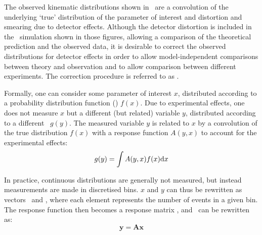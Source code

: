 The observed kinematic distributions shown in~ are a
convolution of the underlying `true' distribution of the parameter of interest
and distortion and smearing due to detector effects. Although 
the detector distortion is included in the \mc\ simulation shown in those
figures, allowing a comparison of the theoretical prediction and the observed
data, it is desirable to correct the observed distributions for detector effects
in order to allow model-independent comparisons between theory and observation
and to allow comparison between different experiments. The correction procedure
is referred to as . 

Formally, one can consider some parameter of interest $x$,
distributed according to a probability distribution function (\probDF) $f(x)$. Due to experimental effects, one
does not measure $x$ but a different (but related) variable $y$, distributed
according to a different \probDF\ $g(y)$. The measured variable $y$ is related to $x$ by a
convolution of the true distribution $f(x)$ with a response function $A(y,x)$ to account for the
experimental effects:
\begin{equation}
g(y) = \int A(y,x)f(x){\rm d}x 
\label{eqn:unfold-conv}
\end{equation}

In practice, continuous distributions are generally not measured, but instead
measurements are made
in discretised bins. $x$ and $y$ can thus be rewritten as
vectors \unfx\ and \unfy, where each element represents the number of events in
a given bin. The response
function then becomes a response matrix \unfA, and~ can be
rewritten as:
\begin{equation}
\mathbf{y} = \mathbf{Ax} 
\label{eqn:unfold-conv-matrix}
\end{equation}

